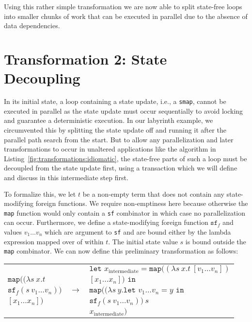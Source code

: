 Using this rather simple transformation we are now able to split state-free loops into smaller chunks of work that can be executed in parallel due to the absence of data dependencies.

\section{Transformation 2: State Decoupling}%
\label{sec:transformations:tf15}

In its initial state, a loop containing a state update, i.e., a \texttt{smap}, cannot be executed in parallel as the state update must occur sequentially to avoid locking and guarantee a deterministic execution.
In our labyrinth example, we circumvented this by splitting the state update off and running it after the parallel path search from the start.
But to allow any parallelization and later transformations to occur in unaltered applications like the algorithm in Listing~\ref{fig:transformations:idiomatic}, the state-free parts of such a loop must be decoupled from the state update first, using a transaction which we will define and discuss in this intermediate step first.

To formalize this, we let $t$ be a non-empty term that does not contain any state-modifying foreign functions.
We require non-emptiness here because otherwise the \texttt{map} function would only contain a \texttt{sf} combinator in which case no parallelization can occur.
Furthermore, we define a state-modifying foreign function $\texttt{sf}_f$ and values $v_1 \dots v_n$ which are argument to \texttt{sf} and are bound either by the lambda expression mapped over of within $t$.
The initial state value $s$ is bound outside the \texttt{map} combinator.
We can now define this preliminary transformation as follows:
\begin{center}
    \begin{tabular}{l c l}
        & \multirow{7}{*}{$\longrightarrow$} & $\texttt{let } x_\text{intermediate} = \texttt{map} ((\lambda s\ x.t\ [v_1 \dots v_n])$\\
        $\texttt{map} ((\lambda s\ x.t$ && \hspace*{4cm}$[x_1 \dots x_n]) \texttt{ in}$\\
        \hspace*{1.65cm}$\texttt{sf}_f (s\ v_1 \dots v_n))$ && \hspace*{.3cm}$\texttt{map}(( \lambda s\ y. \texttt{let } v_1 \dots v_n = y \texttt{ in}$\\
        \hspace*{.9cm}$[x_1 \dots x_n])$ && \hspace*{2.25cm}$\texttt{sf}_f (s\ v_1 \dots v_n))\ s$\\
                                          && \hspace*{1.1cm}$x_\text{intermediate})$
    \end{tabular}
\end{center}

